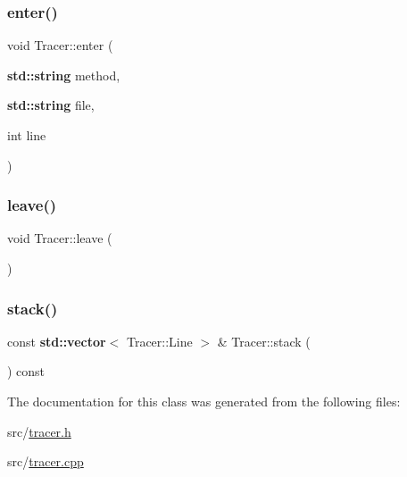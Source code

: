 \mbox{\label{class_tracer_a600965ed14e9129378692f34ab567980}} 
\subsubsection{\texorpdfstring{enter()}{enter()}}
{\footnotesize\ttfamily void Tracer\+::enter (\begin{DoxyParamCaption}\item[{\textbf{ std\+::string}}]{method,  }\item[{\textbf{ std\+::string}}]{file,  }\item[{int}]{line }\end{DoxyParamCaption})}

\mbox{\label{class_tracer_a436f4f1c904d748c93be33966f8a40ed}} 
\subsubsection{\texorpdfstring{leave()}{leave()}}
{\footnotesize\ttfamily void Tracer\+::leave (\begin{DoxyParamCaption}{ }\end{DoxyParamCaption})}

\mbox{\label{class_tracer_afaaf6df2d767ee945262c0a660cd77a9}} 
\subsubsection{\texorpdfstring{stack()}{stack()}}
{\footnotesize\ttfamily const \textbf{ std\+::vector}$<$ Tracer\+::\+Line $>$ \& Tracer\+::stack (\begin{DoxyParamCaption}{ }\end{DoxyParamCaption}) const}



The documentation for this class was generated from the following files\+:\begin{DoxyCompactItemize}
\item 
src/\hyperlink{tracer_8h}{tracer.\+h}\item 
src/\hyperlink{tracer_8cpp}{tracer.\+cpp}\end{DoxyCompactItemize}
